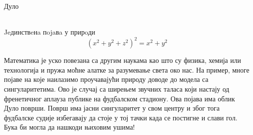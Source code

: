 \documentclass[sr]{./../../common/SurferDesc}%
\begin{document}
\footnotesize


\begin{surferPage}
  \begin{surferTitle}Дуло\end{surferTitle}  
  \\
Jeдинствeнa пojaвa у прирoди  \\
\smallskip
\[(x^2+ y^2+ z^2)^2	= x^2+ y^2\]

\singlespacing
Математика је уско повезана са другим наукама као што су  физика, хемија или технологија и пружа моћне алатке за разумевање света око нас. 
\singlespacing
На пример, многе појаве на које наилазимо проучавајући природу доводе до модела са сингуларитетима.
\singlespacing
Ово је случај са ширењем звучних таласа који настају од френетичног аплауза публике на фудбалском стадиону. Ова појава има облик Дуло површи. Површ има јасни сингуларитет у свом центру и због тога фудбалске судије избегавају да стоје у тој тачки када се постигне и слави гол. Бука би могла да нашкоди њиховим ушима! 


  \begin{surferText}
     \end{surferText}
\end{surferPage}
\end{document}
